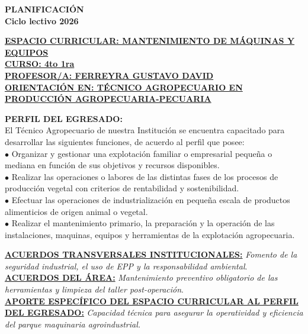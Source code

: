 \documentclass[a4paper,landscape]{article}
\begin{document}
\begin{center}
\fontsize{12pt}{14pt}\selectfont\bfseries PLANIFICACIÓN \\
Ciclo lectivo 2026
\end{center}

\vspace{0.5cm}
\noindent\fontsize{11pt}{13pt}\selectfont\textbf{\underline{ESPACIO CURRICULAR: MANTENIMIENTO DE MÁQUINAS Y EQUIPOS}}\\
\noindent\fontsize{11pt}{13pt}\selectfont\textbf{\underline{CURSO: 4to 1ra}}\\
\noindent\fontsize{11pt}{13pt}\selectfont\textbf{\underline{PROFESOR/A: FERREYRA GUSTAVO DAVID}}\\
\noindent\fontsize{11pt}{13pt}\selectfont\textbf{\underline{ORIENTACIÓN EN: TÉCNICO AGROPECUARIO EN PRODUCCIÓN AGROPECUARIA-PECUARIA}}

\vspace{0.5cm}
\noindent\textbf{PERFIL DEL EGRESADO:}\\
\fontsize{10pt}{12pt}\selectfont El Técnico Agropecuario de nuestra Institución se encuentra capacitado para desarrollar las siguientes funciones, de acuerdo al perfil que posee: \\
$\bullet$ Organizar y gestionar una explotación familiar o empresarial pequeña o mediana en función de sus objetivos y recursos disponibles.\\ $\bullet$ Realizar las operaciones o labores de las distintas fases de los procesos de producción vegetal con criterios de rentabilidad y sostenibilidad.\\ $\bullet$ Efectuar las operaciones de industrialización en pequeña escala de productos alimenticios de origen animal o vegetal.\\ $\bullet$ Realizar el mantenimiento primario, la preparación y la operación de las instalaciones, maquinas, equipos y herramientas de la explotación agropecuaria.

\vspace{0.3cm}
\noindent\textbf{\underline{ACUERDOS TRANSVERSALES INSTITUCIONALES:}} \textit{Fomento de la seguridad industrial, el uso de EPP y la responsabilidad ambiental}.\\
\noindent\textbf{\underline{ACUERDOS DEL ÁREA:}} \textit{Mantenimiento preventivo obligatorio de las herramientas y limpieza del taller post-operación}.\\
\noindent\textbf{\underline{APORTE ESPECÍFICO DEL ESPACIO CURRICULAR AL PERFIL DEL EGRESADO:}} \textit{Capacidad técnica para asegurar la operatividad y eficiencia del parque maquinaria agroindustrial.}
\end{document}
